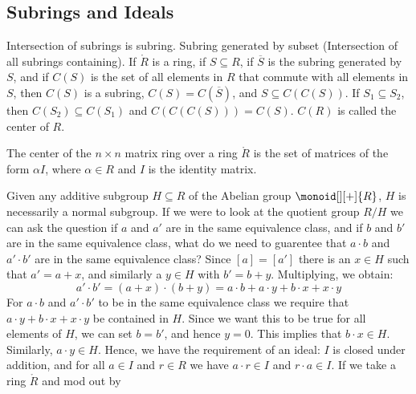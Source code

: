\documentclass{book}                                                           %
\begin{document}
        \subsection{Subrings and Ideals}
            Intersection of subrings is subring. Subring generated by
            subset (Intersection of all subrings containing).
            If $\ring{R}$ is a ring, if $S\subseteq{R}$, if $\overline{S}$
            is the subring generated by $S$, and if $C(S)$ is the set of
            all elements in $R$ that commute with all elements in $S$,
            then $C(S)$ is a subring, $C(S)=C(\overline{S})$, and
            $S\subseteq{C}(C(S))$. If $S_{1}\subseteq{S}_{2}$, then
            $C(S_{2})\subseteq{C}(S_{1})$ and
            $C(C(C(S)))=C(S)$. $C(R)$ is called the center of $R$.
            \begin{example}
                The center of the $n\times{n}$ matrix ring over a ring
                $\ring{R}$ is the set of matrices of the form $\alpha{I}$,
                where $\alpha\in{R}$ and $I$ is the identity matrix.
            \end{example}
            Given any additive subgroup $H\subseteq{R}$ of the Abelian
            group $\monoid[][+]{R}$, $H$ is necessarily a normal subgroup.
            If we were to look at the quotient group $R/H$ we can ask the
            question if $a$ and $a'$ are in the same equivalence class, and
            if $b$ and $b'$ are in the same equivalence class, what do we
            need to guarentee that $a\cdot{b}$ and $a'\cdot{b}'$ are in the
            same equivalence class? Since $[a]=[a']$ there is an $x\in{H}$
            such that $a'=a+x$, and similarly a $y\in{H}$ with $b'=b+y$.
            Multiplying, we obtain:
            \begin{equation}
                a'\cdot{b}'=(a+x)\cdot(b+y)
                    =a\cdot{b}+a\cdot{y}+b\cdot{x}+x\cdot{y}
            \end{equation}
            For $a\cdot{b}$ and $a'\cdot{b}'$ to be in the same equivalence
            class we require that $a\cdot{y}+b\cdot{x}+x\cdot{y}$ be
            contained in $H$. Since we want this to be true for all elements
            of $H$, we can set $b=b'$, and hence $y=0$. This implies that
            $b\cdot{x}\in{H}$. Similarly, $a\cdot{y}\in{H}$. Hence, we have
            the requirement of an ideal: $I$ is closed under addition, and
            for all $a\in{I}$ and $r\in{R}$ we have $a\cdot{r}\in{I}$ and
            $r\cdot{a}\in{I}$. If we take a ring $\ring{R}$ and mod out by
\end{document}
